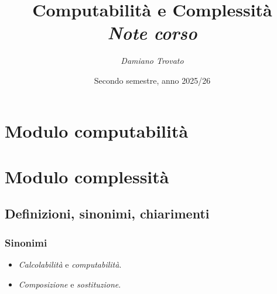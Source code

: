 \documentclass{report}
\title{\Huge\textbf{Computabilità e Complessità}{\huge\\\textbf{\textit{Note corso}}}}
\author{\textit{Damiano Trovato}}
\date{Secondo semestre, anno 2025/26}
\begin{document}
	\maketitle
	\newpage
	\tableofcontents
	\newpage
	
	\part{Modulo computabilità}
	
	
	
	
	
	
	
	
	
	
	
	
	
	
	
	
	\part{Modulo complessità}
	
	
	
	
	
	\chapter*{Definizioni, sinonimi, chiarimenti}
	
	\section{Sinonimi}
	\begin{itemize}
		\item \textit{Calcolabilità} e \textit{computabilità}.
		\item \textit{Composizione} e \textit{sostituzione}.
	\end{itemize}
	
\end{document}

